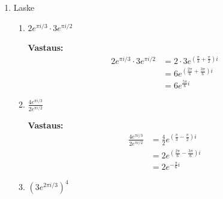 \documentclass[a4paper,12pt]{article}
\begin{document}
\begin{enumerate}
Nyt meillä on funktiot:
\begin{itemize}
    \item $u = g \circ f^{-1}$
    \item $v = f^{-1} \circ g$
\end{itemize}

Tarkistetaan, että nämä toteuttavat annetut ehdot: 
\begin{align*} 
    u \circ f &= (g \circ f^{-1}) \circ f = g \circ f^{-1} \circ f = g \circ \text{id}_X = g. \quad \text{(OK)} \\ 
    f\circ v &=f\circ (f^{-1} \circ g)=f\circ f^{-1} \circ g = \text{id}_X\circ g = g. \quad \text{(OK)}
\end{align*}

Osoitetaan, että löydetyt kuvaukset ovat bijektioita. Tiedämme oletuksesta, että $f$ ja $g$ ovat bijektioita. Tiedämme myös, että bijektion käänteiskuvaus on bijektio (joten $f^{-1}$ on bijektio). Lisäksi tiedämme, että kahden bijektion yhdistetty kuvaus on bijektio.

Koska $u = g \circ f^{-1}$ on kahden bijektion ($g$ ja $f^{-1}$) yhdistetty kuvaus, on $u$ bijektio. Samalla tavalla $v = f^{-1} \circ g$ on kahden bijektion ($f^{-1}$ ja $g$) yhdistetty kuvaus, joten myös $v$ on bijektio.

\item
Laske
\begin{enumerate}
\item $2e^{\pi i/3}\cdot 3e^{\pi i /2}$

\textbf{Vastaus:} 
\begin{align*}
    2e^{\pi i/3}\cdot 3e^{\pi i /2}&=2\cdot 3e^{(\frac{\pi}{3}+\frac{\pi}{2})i} \\
    &=6e^{(\frac{2\pi}{6}+\frac{3\pi}{6})i}\\
    &=6e^{\frac{5\pi}{6}i}
\end{align*}

\item $\frac{4e^{\pi i/3}}{2e^{\pi i /2}}$

\textbf{Vastaus:}
\begin{align*}
    \frac{4e^{\pi i/3}}{2e^{\pi i /2}}&=\frac{4}{2}e^{(\frac{\pi}{3}-\frac{\pi}{2})i}\\
    &=2e^{(\frac{2\pi}{6}-\frac{3\pi}{6})i}\\
    &=2e^{-\frac{\pi}{6}i}
\end{align*}

\item $(3e^{2\pi i/3})^4$


\end{enumerate}
\end{enumerate}
\end{document}
